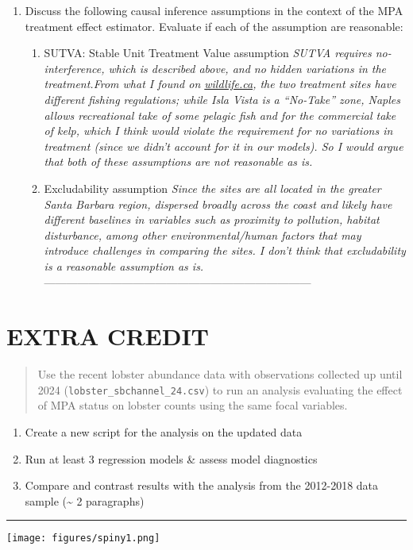 \documentclass[
]{article}
\providecommand{\tightlist}{%
  \setlength{\itemsep}{0pt}\setlength{\parskip}{0pt}}
\begin{document}
\begin{enumerate}
\def\labelenumi{\alph{enumi}.}
\setcounter{enumi}{3}
\item
  Discuss the following causal inference assumptions in the context of
  the MPA treatment effect estimator. Evaluate if each of the assumption
  are reasonable:

  \begin{enumerate}
  \def\labelenumii{\arabic{enumii})}
  \item
    SUTVA: Stable Unit Treatment Value assumption \emph{SUTVA requires
    no-interference, which is described above, and no hidden variations
    in the treatment.From what I found on
    \href{https://wildlife.ca.gov/Conservation/Marine/MPAs/Naples}{wildlife.ca},
    the two treatment sites have different fishing regulations; while
    Isla Vista is a ``No-Take'' zone, Naples allows recreational take of
    some pelagic fish and for the commercial take of kelp, which I think
    would violate the requirement for no variations in treatment (since
    we didn't account for it in our models). So I would argue that both
    of these assumptions are not reasonable as is.}
  \item
    Excludability assumption \emph{Since the sites are all located in
    the greater Santa Barbara region, dispersed broadly across the coast
    and likely have different baselines in variables such as proximity
    to pollution, habitat disturbance, among other environmental/human
    factors that may introduce challenges in comparing the sites. I
    don't think that excludability is a reasonable assumption as is.}
    ------------------------------------------------------------------------
  \end{enumerate}
\end{enumerate}

\section{EXTRA CREDIT}\label{extra-credit}

\begin{quote}
Use the recent lobster abundance data with observations collected up
until 2024 (\texttt{lobster\_sbchannel\_24.csv}) to run an analysis
evaluating the effect of MPA status on lobster counts using the same
focal variables.
\end{quote}

\begin{enumerate}
\def\labelenumi{\alph{enumi}.}
\tightlist
\item
  Create a new script for the analysis on the updated data
\item
  Run at least 3 regression models \& assess model diagnostics
\item
  Compare and contrast results with the analysis from the 2012-2018 data
  sample (\textasciitilde{} 2 paragraphs)
\end{enumerate}

\begin{center}\rule{0.5\linewidth}{0.5pt}\end{center}

\texttt{[image: figures/spiny1.png]}
\end{document}
